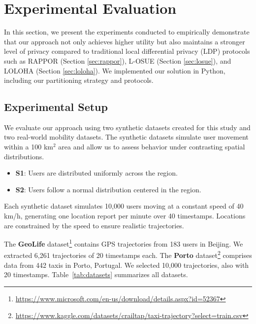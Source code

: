 \section{Experimental Evaluation}
\label{sec:exp_evaluation}
In this section, we present the experiments conducted to empirically demonstrate that our approach not only achieves higher utility but also maintains a stronger level of privacy compared to traditional local differential privacy (LDP) protocols such as RAPPOR (Section \ref{sec:rappor}), L-OSUE (Section \ref{sec:losue}), and LOLOHA (Section \ref{sec:loloha}). We implemented our solution in Python, including our partitioning strategy and protocols. 
% 
\subsection{Experimental Setup}
We evaluate our approach using two synthetic datasets created for this study and two real-world mobility datasets. The synthetic datasets simulate user movement within a 100 km$^2$ area and allow us to assess behavior under contrasting spatial distributions.  
\begin{itemize}
    \item \textbf{S1}: Users are distributed uniformly across the region.
    \item \textbf{S2}: Users follow a normal distribution centered in the region.
\end{itemize}

Each synthetic dataset simulates 10,000 users moving at a constant speed of 40 km/h, generating one location report per minute over 40 timestamps. Locations are constrained by the speed to ensure realistic trajectories.

The \textbf{GeoLife} dataset\footnote{\url{https://www.microsoft.com/en-us/download/details.aspx?id=52367}} contains GPS trajectories from 183 users in Beijing. We extracted 6,261 trajectories of 20 timestamps each.  
The \textbf{Porto} dataset\footnote{\url{https://www.kaggle.com/datasets/crailtap/taxi-trajectory?select=train.csv}} comprises data from 442 taxis in Porto, Portugal. We selected 10,000 trajectories, also with 20 timestamps. Table~\ref{tab:datasets} summarizes all datasets. 

